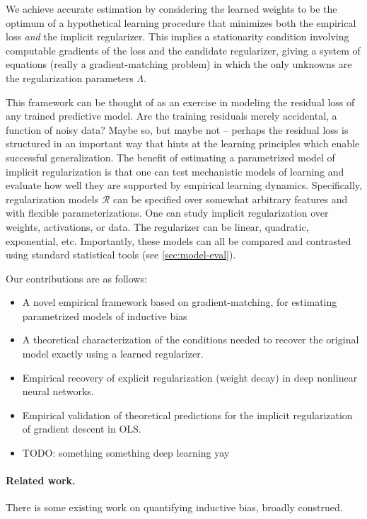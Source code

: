 \documentclass[10pt]{article}
\begin{document}
We achieve accurate estimation by considering the learned weights to be the optimum of a hypothetical learning procedure that minimizes both the empirical loss \emph{and} the implicit regularizer. This implies a stationarity condition involving computable gradients of the loss and the candidate regularizer, giving a system of equations (really a gradient-matching problem) in which the only unknowns are the regularization parameters $\Lambda$.

This framework can be thought of as an exercise in modeling the residual loss of any trained predictive model. Are the training residuals merely accidental, a function of noisy data? Maybe so, but maybe not -- perhaps the residual loss is structured in an important way that hints at the learning principles which enable successful generalization.  
The benefit of estimating a parametrized model of implicit regularization is that one can test mechanistic models of learning and evaluate how well they are supported by empirical learning dynamics. Specifically, regularization models $\mathcal{R}$ can be specified over somewhat arbitrary features and with flexible parameterizations. One can study implicit regularization over weights, activations, or data. The regularizer can be linear, quadratic, exponential, etc. Importantly, these models can all be compared and contrasted using standard statistical tools (see \ref{sec:model-eval}).

Our contributions are as follows:
\begin{itemize}
    \item A novel empirical framework based on gradient-matching, for estimating parametrized models of inductive bias
    \item A theoretical characterization of the conditions needed to recover the original model exactly using a learned regularizer.
    \item Empirical recovery of explicit regularization (weight decay) in deep nonlinear neural networks.
    \item Empirical validation of theoretical predictions for the implicit regularization of gradient descent in OLS.
    \item TODO: something something deep learning yay
\end{itemize}

\paragraph{Related work.} There is some existing work on quantifying inductive bias, broadly construed. 
\end{document}
